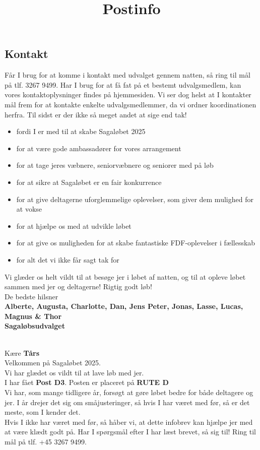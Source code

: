 \subsection{Kontakt}
Får I brug for at komme i kontakt med udvalget gennem natten, så ring til mål på tlf. 3267 9499. Har I brug for at få fat på et bestemt udvalgsmedlem, kan vores kontaktoplysninger findes på hjemmesiden. Vi ser dog helst at I kontakter mål frem for at kontakte enkelte udvalgsmedlemmer, da vi ordner koordinationen herfra.
\newline
Til sidst er der ikke så meget andet at sige end tak!\begin{itemize}
  \item fordi I er med til at skabe Sagaløbet 2025
  \item for at være gode ambassadører for vores arrangement
  \item for at tage jeres væbnere, seniorvæbnere og seniorer med på løb
  \item for at sikre at Sagaløbet er en fair konkurrence
  \item for at give deltagerne uforglemmelige oplevelser, som giver dem mulighed for at vokse
  \item for at hjælpe os med at udvikle løbet
  \item for at give os muligheden for at skabe fantastiske FDF-oplevelser i fællesskab
  \item for alt det vi ikke får sagt tak for
\end{itemize}
Vi glæder os helt vildt til at besøge jer i løbet af natten, og til at opleve løbet sammen med jer og deltagerne!
\newline
Rigtig godt løb!\\
\newline
\textcolor{søblå}{De bedste hilsner}\\
\textcolor{natblå}{\textbf{Alberte, Augusta, Charlotte, Dan, Jens Peter, Jonas, Lasse, Lucas, Magnus \& Thor}}\\
\textcolor{natblå}{\textbf{Sagaløbsudvalget}}\\
\newpage
\title{Postinfo}\\
Kære \textbf{Tårs}\\
\newline
Velkommen på Sagaløbet 2025.\\
Vi har glædet os vildt til at lave løb med jer.\\
\newline
I har fået \textbf{Post D3}. Posten er placeret på \textbf{RUTE D}\\
Vi har, som mange tidligere år, forsøgt at gøre løbet bedre for både deltagere og jer. I år drejer det sig om småjusteringer, så hvis I har været med før, så er det meste, som I kender det.\\
\newline
Hvis I ikke har været med før, så håber vi, at dette infobrev kan hjælpe jer med at være klædt godt på. Har I spørgsmål efter I har læst brevet, så sig til! Ring til mål på tlf. +45 3267 9499.
